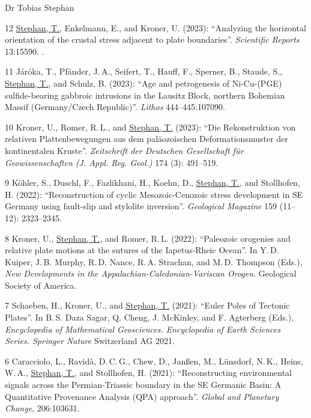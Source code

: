 \documentclass[10pt, paper=letter]{scrartcl} %
\begin{document}
\begin{cv}{\textsf{Dr Tobias Stephan}}
\begin{cvlist}{}
        \item[12] \ul{Stephan, T.}, Enkelmann, E., and Kroner, U. (2023): \enquote{Analyzing the horizontal orientation of the crustal stress adjacent to plate boundaries}. \textit{Scientific Reports} 13:15590. .
        \item[11] Járóka, T.,  Pfänder, J.\,A., Seifert, T., Hauff, F., Sperner, B., Staude, S., \ul{Stephan, T.}, and Schulz, B. (2023): \enquote{Age and petrogenesis of Ni-Cu-(PGE) sulfide-bearing gabbroic intrusions in the Lausitz Block, northern Bohemian Massif (Germany/Czech Republic)}. \textit{Lithos} 444--445:107090. 
        \item[10] Kroner, U., Romer, R.\,L., and \ul{Stephan, T.} (2023): \enquote{Die Rekonstruktion von relativen Plattenbewegungen aus dem paläozoischen Deformationsmuster der kontinentalen Kruste}. \textit{Zeitschrift der Deutschen Gesellschaft für Geowissenschaften (J. Appl. Reg. Geol.)} 174 (3): 491--519. 
        \item[9] K\"ohler, S., Duschl, F., Fazlikhani, H., Koehn, D., \ul{Stephan, T.}, and Stollhofen, H. (2022): \enquote{Reconstruction of cyclic Mesozoic-Cenozoic stress development in SE Germany using fault-slip and stylolite inversion}. \textit{Geological Magazine} 159 (11--12): 2323--2345.\newline
        \item[8] Kroner, U., \ul{Stephan, T.}, and Romer, R.\,L. (2022): \enquote{Paleozoic orogenies and relative plate motions at the sutures of the Iapetus-Rheic Ocean}. In Y.\,D. Kuiper, J.\,B. Murphy, R.\,D. Nance, R.\,A. Strachan, and M.\,D. Thompson (Eds.), \textit{New Developments in the Appalachian-Caledonian-Variscan Orogen}. Geological Society of America. 
        \item[7] Schaeben, H., Kroner, U., and \ul{Stephan, T.} (2021): \enquote{Euler Poles of Tectonic Plates}. In B.\,S. Daza Sagar, Q. Cheng, J. McKinley, and F. Agterberg (Eds.), \textit{Encyclopedia of Mathematical Geosciences. Encyclopedia of Earth Sciences Series. Springer Nature} Switzerland AG 2021. 
        \item[6] Caracciolo, L., Ravid\`a, D.\,C.\,G., Chew, D., Jan{\ss}en, M., L\"unsdorf, N.\,K., Heins, W.\,A., \ul{Stephan, T.}, and Stollhofen, H. (2021): \enquote{Reconstructing environmental signals across the Permian-Triassic boundary in the SE Germanic Basin: A Quantitative Provenance Analysis (QPA) approach}. \textit{Global and Planetary Change}, 206:103631.  

\end{cvlist}
\end{cv}
\end{document}
